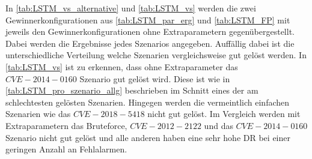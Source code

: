     In  \autoref{tab:LSTM_vs_alternative} und \autoref{tab:LSTM_vs} werden die zwei Gewinnerkonfigurationen aus \autoref{tab:LSTM_par_erg} und \autoref{tab:LSTM_FP} mit jeweils den Gewinnerkonfigurationen ohne Extraparametern gegenübergestellt.
    Dabei werden die Ergebnisse jedes Szenarios angegeben. 
    Auffällig dabei ist die unterschiedliche Verteilung welche Szenarien vergleichsweise gut gelöst werden.
    In \autoref{tab:LSTM_vs} ist zu erkennen, dass ohne Extraparameter das $CVE-2014-0160$ Szenario gut gelöst wird.
    Diese ist wie in \autoref{tab:LSTM_pro_szenario_allg} beschrieben im Schnitt eines der am schlechtesten gelösten Szenarien.
    Hingegen werden die vermeintlich einfachen Szenarien wie das $CVE-2018-5418$ nicht gut gelöst.
    Im Vergleich werden mit Extraparametern das Bruteforce, $CVE-2012-2122$ und das $CVE-2014-0160$ Szenario nicht gut gelöst und alle anderen haben eine sehr hohe \ac{DR} bei einer geringen Anzahl an Fehlalarmen.

